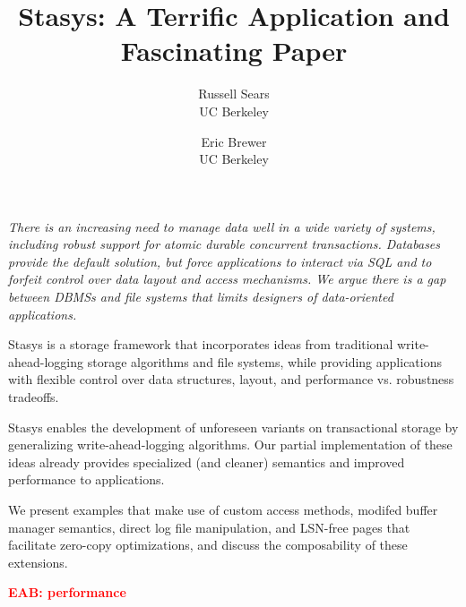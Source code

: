 \documentclass[letterpaper,twocolumn,10pt]{article}
\newcommand{\yad}{Stasys\xspace}
\newcommand{\eab}[1]{\textcolor{red}{\bf EAB: #1}}
\begin{document}
\date{}


\title{\Large \bf \yad: A Terrific Application and Fascinating Paper}

\author{
{\rm Russell Sears}\\
UC Berkeley
\and
{\rm Eric Brewer}\\
UC Berkeley
} %

\maketitle




{\em There is an increasing need to manage data well in a wide variety of
systems, including robust support for atomic durable concurrent
transactions.  Databases provide the default solution, but force
applications to interact via SQL and to forfeit control over data
layout and access mechanisms.  We argue there is a gap between DBMSs and file systems that limits designers of data-oriented applications.

\yad is a storage framework that incorporates ideas from traditional
write-ahead-logging storage algorithms and file systems,
while providing applications with flexible control over data structures, layout, and performance vs. robustness tradeoffs.

\yad enables the development of
unforeseen variants on transactional storage by generalizing
write-ahead-logging algorithms.  Our partial implementation of these
ideas already provides specialized (and cleaner) semantics and
improved performance to applications.


We present examples that make use of custom access methods,
modifed buffer manager semantics, direct log file manipulation, and
LSN-free pages that facilitate zero-copy optimizations, and discuss
the composability of these extensions.

\eab{performance}

}
\end{document}
